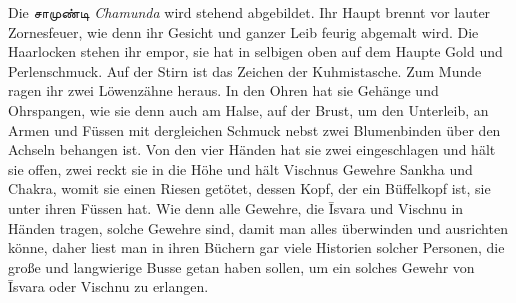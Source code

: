 \documentclass{article}
\newcommand{\TamilText}[1]{\texttamil{#1}}
\newcommand{\tam}[1]{\TamilText{#1}}
\begin{document}
Die \tam{சாமுண்டி} \emph{Chamunda} wird stehend abgebildet. Ihr Haupt brennt vor lauter Zornesfeuer, wie denn ihr Gesicht und ganzer Leib feurig abgemalt wird. Die Haarlocken stehen ihr empor, sie hat in selbigen oben auf dem Haupte Gold und Perlenschmuck. Auf der Stirn ist das Zeichen der Kuhmistasche. Zum Munde ragen ihr zwei Löwenzähne heraus. In den Ohren hat sie Gehänge und Ohrspangen, wie sie denn auch am Halse, auf der Brust, um den Unterleib, an Armen und Füssen mit dergleichen Schmuck nebst zwei Blumenbinden über den Achseln behangen ist. Von den vier Händen hat sie zwei eingeschlagen und hält sie offen, zwei reckt sie in die Höhe und hält Vischnus Gewehre Sankha und Chakra, womit sie einen Riesen getötet, dessen Kopf, der ein Büffelkopf ist, sie unter ihren Füssen hat. Wie denn alle Gewehre, die \={I}svara und Vischnu in Händen tragen, solche Gewehre sind, damit man alles überwinden und ausrichten könne, daher liest man in ihren Büchern gar viele Historien solcher Personen, die große und langwierige Busse getan haben sollen, um ein solches Gewehr von \={I}svara oder Vischnu zu erlangen.
\end{document}
